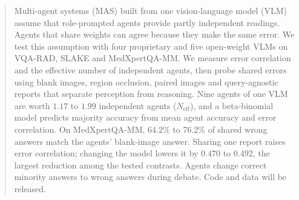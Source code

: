 \begin{abstract}
Multi-agent systems (MAS) built from one vision-language model (VLM) assume that role-prompted agents provide partly independent readings. Agents that share weights can agree because they make the same error. We test this assumption with four proprietary and five open-weight VLMs on VQA-RAD, SLAKE and MedXpertQA-MM. We measure error correlation and the effective number of independent agents, then probe shared errors using blank images, region occlusion, paired images and query-agnostic reports that separate perception from reasoning. Nine agents of one VLM are worth $1.17$ to $1.99$ independent agents ($N_{\mathrm{eff}}$), and a beta-binomial model predicts majority accuracy from mean agent accuracy and error correlation. On MedXpertQA-MM, $64.2\%$ to $76.2\%$ of shared wrong answers match the agents' blank-image answer. Sharing one report raises error correlation; changing the model lowers it by $0.470$ to $0.492$, the largest reduction among the tested contrasts. Agents change correct minority answers to wrong answers during debate. Code and data will be released.
\end{abstract}
